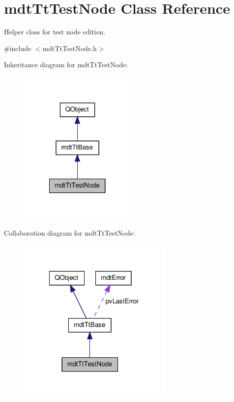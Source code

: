 \hypertarget{classmdt_tt_test_node}{\section{mdt\-Tt\-Test\-Node Class Reference}
\label{classmdt_tt_test_node}
}


Helper class for test node edition.  




{\ttfamily \#include $<$mdt\-Tt\-Test\-Node.\-h$>$}



Inheritance diagram for mdt\-Tt\-Test\-Node\-:\nopagebreak
\begin{figure}[H]
\begin{center}
\leavevmode
\includegraphics[width=164pt]{classmdt_tt_test_node__inherit__graph}
\end{center}
\end{figure}


Collaboration diagram for mdt\-Tt\-Test\-Node\-:\nopagebreak
\begin{figure}[H]
\begin{center}
\leavevmode
\includegraphics[width=216pt]{classmdt_tt_test_node__coll__graph}
\end{center}
\end{figure}
